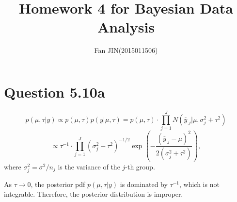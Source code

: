 \documentclass{article}
\begin{document}
\title{\textsf{Homework 4 for Bayesian Data Analysis}}
\author{Fan JIN\quad (2015011506)}
\maketitle

\section*{Question 5.10a}
{
    $$p(\mu, \tau | y) \propto p(\mu, \tau) p(y | \mu, \tau) = p(\mu, \tau) \cdot \prod_{j=1}^{J} {N(\bar{y}_{.j} | \mu, \sigma_j^2 + \tau^2)}$$
    $$\propto \tau^{-1} \cdot \prod_{j=1}^{J} {(\sigma_j^2 + \tau^2)^{-1/2} \exp{ \left( - \frac{(\bar{y}_{.j} - \mu)^2}{2(\sigma_j^2 + \tau^2)} \right) }},$$
    where $\sigma_j^2 = \sigma^2 / n_j$ is the variance of the $j$-th group.

    As $\tau \rightarrow 0$, the posterior pdf $p(\mu, \tau | y)$ is dominated by $\tau^{-1}$, which is not integrable. Therefore, the posterior distribution is improper.
}
\end{document}

